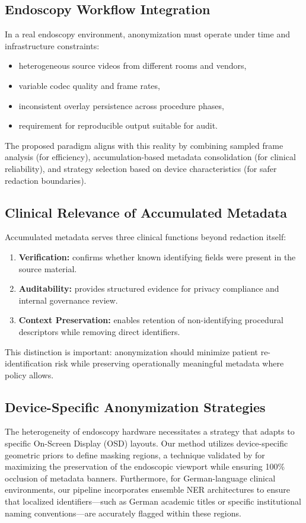 \documentclass{article}
\begin{document}
\subsection{Endoscopy Workflow Integration}
In a real endoscopy environment, anonymization must operate under time and
infrastructure constraints:
\begin{itemize}
  \item heterogeneous source videos from different rooms and vendors,
  \item variable codec quality and frame rates,
  \item inconsistent overlay persistence across procedure phases,
  \item requirement for reproducible output suitable for audit.
\end{itemize}

The proposed paradigm aligns with this reality by combining sampled frame
analysis (for efficiency), accumulation-based metadata consolidation (for
clinical reliability), and strategy selection based on device characteristics
(for safer redaction boundaries).

\subsection{Clinical Relevance of Accumulated Metadata}
Accumulated metadata serves three clinical functions beyond redaction itself:
\begin{enumerate}
  \item \textbf{Verification:} confirms whether known identifying fields were
  present in the source material.
  \item \textbf{Auditability:} provides structured evidence for privacy
  compliance and internal governance review.
  \item \textbf{Context Preservation:} enables retention of non-identifying
  procedural descriptors while removing direct identifiers.
\end{enumerate}

This distinction is important: anonymization should minimize patient
re-identification risk while preserving operationally meaningful metadata where
policy allows.

\subsection{Device-Specific Anonymization Strategies}
The heterogeneity of endoscopy hardware necessitates a strategy that adapts 
to specific On-Screen Display (OSD) layouts. Our method utilizes 
device-specific geometric priors to define masking regions, a technique 
validated by \cite{richter2024geometric} for maximizing the preservation of 
the endoscopic viewport while ensuring 100\% occlusion of metadata banners. 
Furthermore, for German-language clinical environments, our pipeline 
incorporates ensemble NER architectures \cite{muller2025clinical} to ensure 
that localized identifiers—such as German academic titles or specific 
institutional naming conventions—are accurately flagged within these regions.
\end{document}
